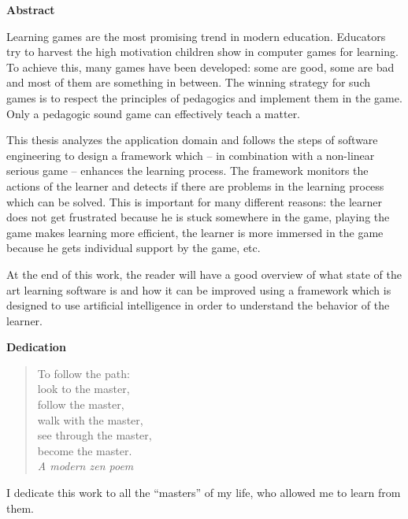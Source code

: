 \newpage
\thispagestyle{empty}
\cleardoublepage
\begin{center}
{\huge \textbf{Abstract}\\}
\end{center}
Learning games are the most promising trend in modern education. Educators try to
harvest the high motivation children show in computer games for learning. To achieve
this, many games have been developed: some are good, some are bad and most of them are something
in between. The winning strategy for such games is to respect the principles of pedagogics
and implement them in the game. Only a pedagogic sound game can effectively teach a matter.

This thesis analyzes the application domain and follows the steps of software
engineering to design a framework which -- in combination with a non-linear serious game
-- enhances the learning process. The framework monitors the actions of the learner
and detects if there are problems in the learning process which can be solved. This
is important for many different reasons: the learner does not get frustrated because
he is stuck somewhere in the game, playing the game makes learning more efficient,
the learner is more immersed in the game because he gets individual support by the game, etc.

At the end of this work, the reader will have a good overview of what state of
the art learning software is and how it can be improved using a framework which is designed to use
artificial intelligence in order to understand the behavior of the learner.

\newpage
\cleardoublepage
\begin{center}
{\huge \textbf{Dedication}\\}
\end{center}
\vspace{5cm}
\begin{quote}
\begin{center}
{\large To follow the path:\\
look to the master,\\
follow the master,\\
walk with the master,\\
see through the master,\\
become the master.\\[5mm]}
\hspace{4cm}
{\small \em A modern zen poem}
\end{center}
\end{quote}

I dedicate this work to all the ``masters'' of my life, who allowed me to learn from them.\\
